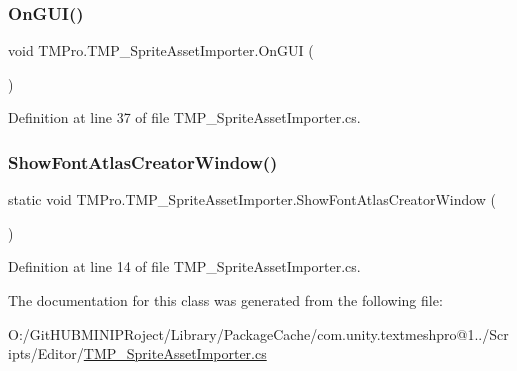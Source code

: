 \subsubsection{\texorpdfstring{OnGUI()}{OnGUI()}}
{\footnotesize\ttfamily void T\+M\+Pro.\+T\+M\+P\+\_\+\+Sprite\+Asset\+Importer.\+On\+G\+UI (\begin{DoxyParamCaption}{ }\end{DoxyParamCaption})}



Definition at line 37 of file T\+M\+P\+\_\+\+Sprite\+Asset\+Importer.\+cs.

\mbox{\label{class_t_m_pro_1_1_t_m_p___sprite_asset_importer_a3df4961b68f84eaa434f9204c4919963}} 
\subsubsection{\texorpdfstring{ShowFontAtlasCreatorWindow()}{ShowFontAtlasCreatorWindow()}}
{\footnotesize\ttfamily static void T\+M\+Pro.\+T\+M\+P\+\_\+\+Sprite\+Asset\+Importer.\+Show\+Font\+Atlas\+Creator\+Window (\begin{DoxyParamCaption}{ }\end{DoxyParamCaption})\hspace{0.3cm}{\ttfamily [static]}}



Definition at line 14 of file T\+M\+P\+\_\+\+Sprite\+Asset\+Importer.\+cs.



The documentation for this class was generated from the following file\+:\begin{DoxyCompactItemize}
\item 
O\+:/\+Git\+H\+U\+B\+M\+I\+N\+I\+P\+Roject/\+Library/\+Package\+Cache/com.\+unity.\+textmeshpro@1../\+Scripts/\+Editor/\mbox{\hyperlink{_t_m_p___sprite_asset_importer_8cs}{T\+M\+P\+\_\+\+Sprite\+Asset\+Importer.\+cs}}\end{DoxyCompactItemize}
